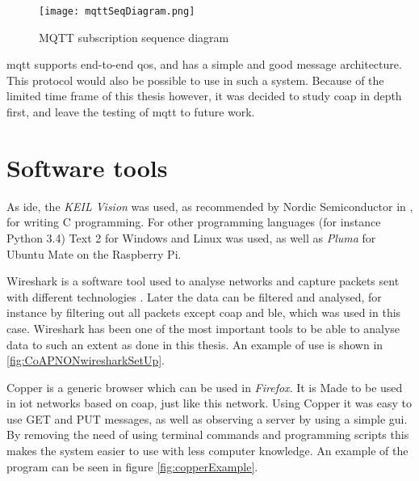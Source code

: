\begin{figure}[ht]
    \centering
    \texttt{[image: mqttSeqDiagram.png]}    
    \caption{MQTT subscription sequence diagram}
    \label{fig:mqttSeqDiagram}
\end{figure}

\noindent \gls{mqtt} supports end-to-end \gls{qos}, and has a simple and good message architecture. This protocol would also be possible to use in such a system. Because of the limited time frame of this thesis however, it was decided to study \gls{coap} in depth first, and leave the testing of \gls{mqtt} to future work. 



\section{Software tools}

\noindent As \gls{ide}, the \textit{KEIL Vision} was used, as recommended by Nordic Semiconductor in \cite{nordicSoftwareTools}, for writing C programming. For other programming languages (for instance Python 3.4)  Text 2 for Windows and Linux was used, as well as \textit{Pluma} for Ubuntu Mate on the Raspberry Pi. 

\noindent Wireshark is a software tool used to analyse networks and capture packets sent with different technologies \cite{lamping2004wireshark}. Later the data can be filtered and analysed, for instance by filtering out all packets except \gls{coap} and \gls{ble}, which was used in this case. Wireshark has been one of the most important tools to be able to analyse data to such an extent as done in this thesis. An example of use is shown in \ref{fig:CoAPNONwiresharkSetUp}. 

\noindent Copper is a generic browser which can be used in \textit{Firefox}. It is Made to be used in \gls{iot} networks based on \gls{coap}, just like this network. Using Copper it was easy to use GET and PUT messages, as well as observing a server by using a simple \gls{gui}. By removing the need of using terminal commands and programming scripts this makes the system easier to use with less computer knowledge. An example of the program can be seen in figure \ref{fig:copperExample}. 
\cite{kovatsch2011demo}

